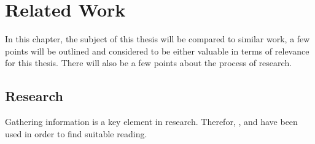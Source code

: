 \chapter{Related Work}
\label{ch:RW}

In this chapter, the subject of this thesis will be compared to similar work, a few points will be outlined and considered to be either valuable in terms of relevance for this thesis. There will also be a few points about the process of research.\\

\section{Research}
\label{sec:res}

Gathering information is a key element in research. Therefor, , and  have been used in order to find suitable reading.\\

